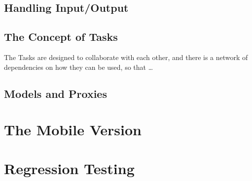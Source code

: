 \documentclass[trojita]{subfiles}
\begin{document}
\subsection{Handling Input/Output}

\subsection{The Concept of Tasks}

The Tasks are designed to collaborate with each other, and there is a network of dependencies on how they can be used,
so that \ldots

\subsection{Models and Proxies}

\section{The Mobile Version}

\section{Regression Testing}
\end{document}
